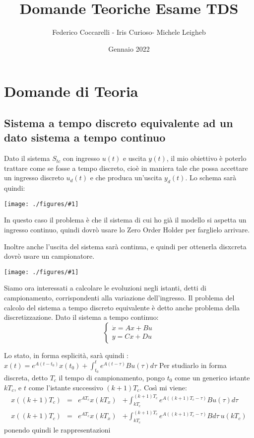 \documentclass{article}
\title{Domande Teoriche Esame TDS}
\author{Federico Coccarelli - Iris Curioso- Michele Leigheb}
\date{Gennaio 2022}
\newcommand{\incfig}[2]{%
	\texttt{[image: ./figures/\#1]}%
}
\begin{document}
\maketitle

\large
\tableofcontents{}


\section{Domande di Teoria}
\subsection{Sistema a tempo discreto equivalente ad un dato sistema a tempo continuo}
Dato il sistema $S_{tc}$ con ingresso $u(t)$ e uscita $y(t)$, il mio obiettivo è poterlo trattare come se fosse a tempo discreto, cioè in maniera tale
che possa accettare un ingresso discreto $u_d(t)$ e che produca un'uscita $y_d(t)$.
Lo schema sarà quindi:

\incfig{ZOH.jpeg}{0.4}

In questo caso il problema è che il sistema di cui ho già il modello si aspetta un ingresso continuo, quindi dovrò usare lo Zero Order Holder per
farglielo arrivare.

Inoltre anche l'uscita del sistema sarà continua, e quindi per ottenerla disxcreta dovrò usare un campionatore.

\incfig{discreto.jpeg}{0.4}

Siamo ora interessati a calcolare le evoluzioni negli istanti, detti di campionamento, corrispondenti alla variazione dell'ingresso.
Il problema del calcolo del sistema a tempo discreto equivalente è detto anche problema della discretizzazione. Dato il sistema a tempo continuo:
\[
\begin{cases}
    \dot{x} = Ax+Bu\\
    y = Cx+Du
\end{cases}
\]

Lo stato, in forma esplicità, sarà quindi : \(\displaystyle x(t) = e^{A(t-t_0)}x(t_0) + \int_{t_0}^{t} e^{A(t-\tau)}Bu(\tau)d\tau\)
Per studiarlo in forma discreta, detto $T_c$ il tempo di campionamento, pongo $t_0$ come un generico istante $kT_c$, e $t$ come l'istante successivo
$(k+1)T_c$. Così mi viene:
\begin{align*} 
    x((k+1)T_c) &=& e^{AT_c}x(kT_x) &+ \int_{kT_c}^{(k+1)T_c} e ^{A((k+1)T_c-\tau)}B u(\tau) d\tau \\
    x((k+1)T_c) &=& e^{AT_c}x(kT_x) &+ \int_{kT_c}^{(k+1)T_c} e ^{A((k+1)T_c-\tau)}B  d\tau \ u(kT_c)
\end{align*}
ponendo quindi le rappresentazioni 
\end{document}
